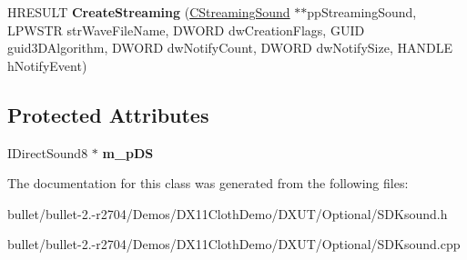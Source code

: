 \begin{DoxyCompactItemize}
\item 
\hypertarget{class_c_sound_manager_abbcd3543cde00e741c02ae2864516a2c}{H\+R\+E\+S\+U\+L\+T {\bfseries Create\+Streaming} (\hyperlink{class_c_streaming_sound}{C\+Streaming\+Sound} $\ast$$\ast$pp\+Streaming\+Sound, L\+P\+W\+S\+T\+R str\+Wave\+File\+Name, D\+W\+O\+R\+D dw\+Creation\+Flags, G\+U\+I\+D guid3\+D\+Algorithm, D\+W\+O\+R\+D dw\+Notify\+Count, D\+W\+O\+R\+D dw\+Notify\+Size, H\+A\+N\+D\+L\+E h\+Notify\+Event)}\label{class_c_sound_manager_abbcd3543cde00e741c02ae2864516a2c}

\end{DoxyCompactItemize}
\subsection*{Protected Attributes}
\begin{DoxyCompactItemize}
\item 
\hypertarget{class_c_sound_manager_a453dcab3ba8fc5f622da84e609cb3363}{I\+Direct\+Sound8 $\ast$ {\bfseries m\+\_\+p\+D\+S}}\label{class_c_sound_manager_a453dcab3ba8fc5f622da84e609cb3363}

\end{DoxyCompactItemize}


The documentation for this class was generated from the following files\+:\begin{DoxyCompactItemize}
\item 
bullet/bullet-\/2.-\/r2704/\+Demos/\+D\+X11\+Cloth\+Demo/\+D\+X\+U\+T/\+Optional/S\+D\+Ksound.\+h\item 
bullet/bullet-\/2.-\/r2704/\+Demos/\+D\+X11\+Cloth\+Demo/\+D\+X\+U\+T/\+Optional/S\+D\+Ksound.\+cpp\end{DoxyCompactItemize}
